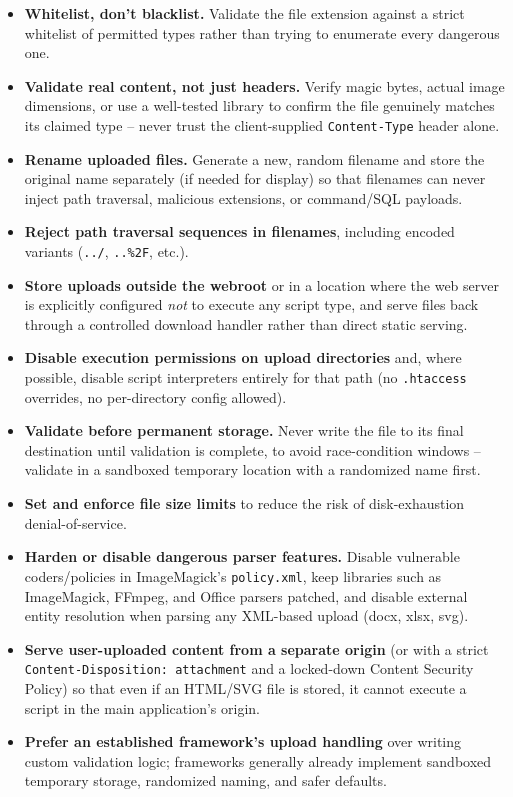\documentclass[11pt]{article}
\begin{document}
\begin{itemize}[leftmargin=1.4em]
    \item \textbf{Whitelist, don't blacklist.} Validate the file extension against a strict whitelist of permitted types rather than trying to enumerate every dangerous one.
    \item \textbf{Validate real content, not just headers.} Verify magic bytes, actual image dimensions, or use a well-tested library to confirm the file genuinely matches its claimed type -- never trust the client-supplied \texttt{Content-Type} header alone.
    \item \textbf{Rename uploaded files.} Generate a new, random filename and store the original name separately (if needed for display) so that filenames can never inject path traversal, malicious extensions, or command/SQL payloads.
    \item \textbf{Reject path traversal sequences in filenames}, including encoded variants (\texttt{../}, \texttt{..\%2F}, etc.).
    \item \textbf{Store uploads outside the webroot} or in a location where the web server is explicitly configured \emph{not} to execute any script type, and serve files back through a controlled download handler rather than direct static serving.
    \item \textbf{Disable execution permissions on upload directories} and, where possible, disable script interpreters entirely for that path (no \texttt{.htaccess} overrides, no per-directory config allowed).
    \item \textbf{Validate before permanent storage.} Never write the file to its final destination until validation is complete, to avoid race-condition windows -- validate in a sandboxed temporary location with a randomized name first.
    \item \textbf{Set and enforce file size limits} to reduce the risk of disk-exhaustion denial-of-service.
    \item \textbf{Harden or disable dangerous parser features.} Disable vulnerable coders/policies in ImageMagick's \texttt{policy.xml}, keep libraries such as ImageMagick, FFmpeg, and Office parsers patched, and disable external entity resolution when parsing any XML-based upload (docx, xlsx, svg).
    \item \textbf{Serve user-uploaded content from a separate origin} (or with a strict \texttt{Content-Disposition: attachment} and a locked-down Content Security Policy) so that even if an HTML/SVG file is stored, it cannot execute a script in the main application's origin.
    \item \textbf{Prefer an established framework's upload handling} over writing custom validation logic; frameworks generally already implement sandboxed temporary storage, randomized naming, and safer defaults.
\end{itemize}
\end{document}
